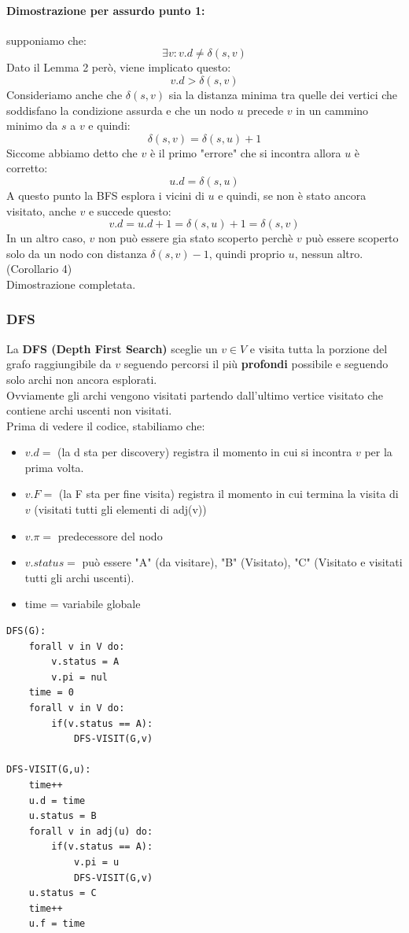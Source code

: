 \documentclass[a4paper,12pt]{article}
\begin{document}
\paragraph{Dimostrazione per assurdo punto 1:} supponiamo che:
\[
\exists v : v.d \ne \delta(s,v)
\]
Dato il Lemma 2 però, viene implicato questo:
\[
v.d > \delta(s,v)
\]
Consideriamo anche che $\delta(s,v)$ sia la distanza minima tra quelle dei vertici che soddisfano la condizione assurda e che un nodo $u$ precede $v$ in un cammino minimo da $s$ a $v$ e quindi:
\[
\delta(s,v) = \delta(s,u) + 1
\]
Siccome abbiamo detto che $v$ è il primo "errore" che si incontra allora $u$ è corretto:
\[
u.d = \delta(s,u)
\]
A questo punto la BFS esplora i vicini di $u$ e quindi, se non è stato ancora visitato, anche $v$ e succede questo:
\[
v.d = u.d + 1 = \delta(s,u) + 1 = \delta(s,v)
\]
In un altro caso, $v$ non può essere gia stato scoperto perchè $v$ può essere scoperto solo da un nodo con distanza $\delta(s,v) - 1$, quindi proprio $u$, nessun altro. (Corollario 4)\\
Dimostrazione completata.
\subsubsection{DFS}
La \textbf{DFS (Depth First Search)} sceglie un $v \in V$ e visita tutta la porzione del grafo raggiungibile da $v$ seguendo percorsi il più \textbf{profondi} possibile e seguendo solo archi non ancora esplorati.\\
Ovviamente gli archi vengono visitati partendo dall'ultimo vertice visitato che contiene archi uscenti non visitati.\\
Prima di vedere il codice, stabiliamo che:
\begin{itemize}
    \item $v.d = $ (la d sta per discovery) registra il momento in cui si incontra $v$ per la prima volta.
    \item $v.F = $ (la F sta per fine visita) registra il momento in cui termina la visita di $v$ (visitati tutti gli elementi di adj(v))
    \item $v.\pi = $ predecessore del nodo
    \item $v.status =$ può essere "A" (da visitare), "B" (Visitato), "C" (Visitato e visitati tutti gli archi uscenti).
    \item time = variabile globale
\end{itemize}
\begin{lstlisting}
DFS(G):
    forall v in V do:
        v.status = A
        v.pi = nul
    time = 0
    forall v in V do:
        if(v.status == A):
            DFS-VISIT(G,v)

DFS-VISIT(G,u):
    time++
    u.d = time
    u.status = B
    forall v in adj(u) do:
        if(v.status == A):
            v.pi = u
            DFS-VISIT(G,v)
    u.status = C
    time++
    u.f = time
\end{lstlisting}
\end{document}
